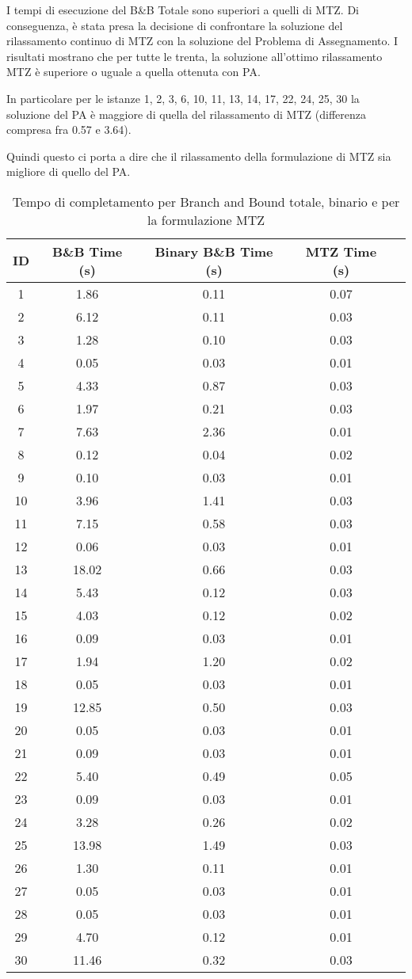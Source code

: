 I tempi di esecuzione del B\&B Totale sono superiori a quelli di MTZ. Di conseguenza, è stata presa la decisione di confrontare la soluzione del rilassamento continuo di MTZ con la soluzione del Problema di Assegnamento. I risultati mostrano che per tutte le trenta, la soluzione all'ottimo rilassamento MTZ è superiore o uguale a quella ottenuta con PA. 

In particolare per le istanze 1, 2, 3, 6, 10, 11, 13, 14, 17, 22, 24, 25, 30 la soluzione del PA è maggiore di quella del rilassamento di MTZ (differenza compresa fra 0.57 e 3.64).

Quindi questo ci porta a dire che il rilassamento della formulazione di MTZ sia migliore di quello del PA. 

\begin{table}[htbp]
    \centering
    \begin{tabular}{|c|c|c|c|c|}
        \hline
        \textbf{ID} & \textbf{B\&B Time (s)} & \textbf{Binary B\&B Time (s)} & \textbf{MTZ Time (s)} \\
        \hline
        1 & 1.86 & 0.11 & 0.07 \\
2 & 6.12 & 0.11 & 0.03 \\
3 & 1.28 & 0.10 & 0.03 \\
4 & 0.05 & 0.03 & 0.01 \\
5 & 4.33 & 0.87 & 0.03 \\
6 & 1.97 & 0.21 & 0.03 \\
7 & 7.63 & 2.36 & 0.01 \\
8 & 0.12 & 0.04 & 0.02 \\
9 & 0.10 & 0.03 & 0.01 \\
10 & 3.96 & 1.41 & 0.03 \\
11 & 7.15 & 0.58 & 0.03 \\
12 & 0.06 & 0.03 & 0.01 \\
13 & 18.02 & 0.66 & 0.03 \\
14 & 5.43 & 0.12 & 0.03 \\
15 & 4.03 & 0.12 & 0.02 \\
16 & 0.09 & 0.03 & 0.01 \\
17 & 1.94 & 1.20 & 0.02 \\
18 & 0.05 & 0.03 & 0.01 \\
19 & 12.85 & 0.50 & 0.03 \\
20 & 0.05 & 0.03 & 0.01 \\
21 & 0.09 & 0.03 & 0.01 \\
22 & 5.40 & 0.49 & 0.05 \\
23 & 0.09 & 0.03 & 0.01 \\
24 & 3.28 & 0.26 & 0.02 \\
25 & 13.98 & 1.49 & 0.03 \\
26 & 1.30 & 0.11 & 0.01 \\
27 & 0.05 & 0.03 & 0.01 \\
28 & 0.05 & 0.03 & 0.01 \\
29 & 4.70 & 0.12 & 0.01 \\
30 & 11.46 & 0.32 & 0.03 \\
        \hline
    \end{tabular}
    \caption{Tempo di completamento per Branch and Bound totale, binario e per la formulazione MTZ}
    \label{tab:time_table}
\end{table}
